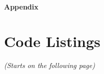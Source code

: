 \appendix

\begin{center}
    \LARGE{\textbf{Appendix}}
\end{center}

\section{Code Listings}
\textit{(Starts on the following page)}









